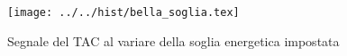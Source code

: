 \begin{figure}[h] \centering\texttt{[image: ../../hist/bella\_soglia.tex]}\caption{Segnale del TAC al variare della soglia energetica impostata}\label{hist:bella_soglia} \end{figure}
